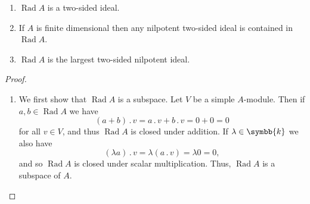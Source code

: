 \documentclass[fleqn]{NotesClass}
\renewcommand{\field}{\symbb{k}}
\newcommand{\action}{\mathbin{.}}
\DeclareMathOperator{\Rad}{Rad}
\begin{document}
    \begin{prp}{}{}
        \begin{enumerate}
            \item \(\Rad A\) is a two-sided ideal.
            \item If \(A\) is finite dimensional then any nilpotent two-sided ideal is contained in \(\Rad A\).
            \item \(\Rad A\) is the largest two-sided nilpotent ideal.
        \end{enumerate}
        \begin{proof}
            \begin{enumerate}
                \item We first show that \(\Rad A\) is a subspace.
                Let \(V\) be a simple \(A\)-module.
                Then if \(a, b \in \Rad A\) we have 
                \begin{equation}
                    (a + b) \action v = a \action v + b \action v = 0 + 0 = 0
                \end{equation}
                for all \(v \in V\), and thus \(\Rad A\) is closed under addition.
                If \(\lambda \in \field\) we also have
                \begin{equation}
                    (\lambda a) \action v = \lambda(a \action v) = \lambda 0 = 0,
                \end{equation}
                and so \(\Rad A\) is closed under scalar multiplication.
                Thus, \(\Rad A\) is a subspace of \(A\).
                

\end{enumerate}
\end{proof}
\end{prp}
\end{document}

